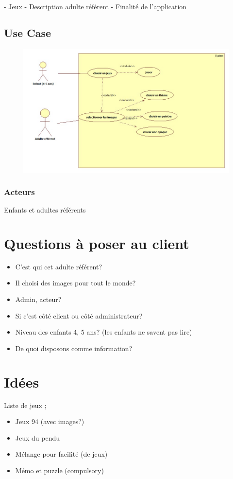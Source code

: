 \documentclass[12pt,a4paper]{report}
\begin{document}
- Jeux
- Description adulte référent
- Finalité de l'application


\section{Use Case}
\begin{figure}[!h]
 \centering
 \includegraphics[width=440px]{UseCase.jpg}
\end{figure}

\subsection{Acteurs}
Enfants et adultes référents

\chapter{Questions à poser au client}

\begin{itemize}
\item C'est qui cet adulte référent? 
\item Il choisi des images pour tout le monde?
\item Admin, acteur? 
\item Si c'est côté client ou côté administrateur? 
\item Niveau des enfants 4, 5 ans? (les enfants ne savent pas lire)
\item De quoi disposons comme information?
\end{itemize}

\chapter{Idées}

Liste de jeux ;
\begin{itemize}
\item Jeux 94 (avec images?)
\item Jeux du pendu
\item Mélange pour facilité (de jeux)
\item Mémo et puzzle (compulsory)
\end{itemize}
\end{document}
